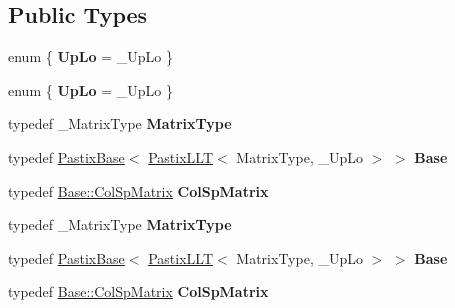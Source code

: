 \subsection*{Public Types}
\begin{DoxyCompactItemize}
\item 
\mbox{\label{class_eigen_1_1_pastix_l_l_t_a9c5f9cd5fb1c640c46487707e2403747}} 
enum \{ {\bfseries Up\+Lo} = \+\_\+\+Up\+Lo
 \}
\item 
\mbox{\label{class_eigen_1_1_pastix_l_l_t_a2a2f7ab8553bb9b891b5be7cd0f7a7d4}} 
enum \{ {\bfseries Up\+Lo} = \+\_\+\+Up\+Lo
 \}
\item 
\mbox{\label{class_eigen_1_1_pastix_l_l_t_a94474b44621be2dec32960c129b4f780}} 
typedef \+\_\+\+Matrix\+Type {\bfseries Matrix\+Type}
\item 
\mbox{\label{class_eigen_1_1_pastix_l_l_t_af2b56fad4abb8acff2a0b649a80b5196}} 
typedef \hyperlink{class_eigen_1_1_pastix_base}{Pastix\+Base}$<$ \hyperlink{class_eigen_1_1_pastix_l_l_t}{Pastix\+L\+LT}$<$ Matrix\+Type, \+\_\+\+Up\+Lo $>$ $>$ {\bfseries Base}
\item 
\mbox{\label{class_eigen_1_1_pastix_l_l_t_adbf55149cb1588906b91e5e162573449}} 
typedef \hyperlink{group___sparse_core___module}{Base\+::\+Col\+Sp\+Matrix} {\bfseries Col\+Sp\+Matrix}
\item 
\mbox{\label{class_eigen_1_1_pastix_l_l_t_a94474b44621be2dec32960c129b4f780}} 
typedef \+\_\+\+Matrix\+Type {\bfseries Matrix\+Type}
\item 
\mbox{\label{class_eigen_1_1_pastix_l_l_t_af2b56fad4abb8acff2a0b649a80b5196}} 
typedef \hyperlink{class_eigen_1_1_pastix_base}{Pastix\+Base}$<$ \hyperlink{class_eigen_1_1_pastix_l_l_t}{Pastix\+L\+LT}$<$ Matrix\+Type, \+\_\+\+Up\+Lo $>$ $>$ {\bfseries Base}
\item 
\mbox{\label{class_eigen_1_1_pastix_l_l_t_adbf55149cb1588906b91e5e162573449}} 
typedef \hyperlink{group___sparse_core___module}{Base\+::\+Col\+Sp\+Matrix} {\bfseries Col\+Sp\+Matrix}
\end{DoxyCompactItemize}
